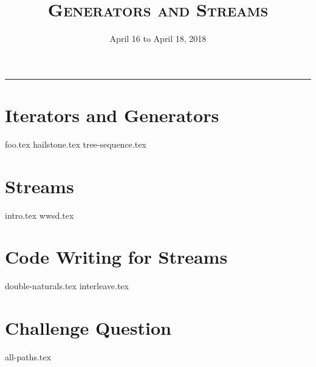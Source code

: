 \documentclass{exam}
\title{\textsc{Generators and Streams}}
\date{April 16 to April 18, 2018}
\begin{document}
\maketitle
\rule{\textwidth}{0.15em}
\fontsize{12}{15}\selectfont


\section{Iterators and Generators}
\begin{questions}
{foo.tex}
\newpage
{hailstone.tex}
{tree-sequence.tex}
\end{questions}

\newpage
\section{Streams}
\begin{questions}
{intro.tex}
\newpage
{wwsd.tex}
\end{questions}

\newpage
\section{Code Writing for Streams}
\begin{questions}
{double-naturals.tex}
{interleave.tex}
\end{questions}

\newpage
\section{Challenge Question}
\begin{questions}
{all-paths.tex}
\end{questions}

\end{document}
